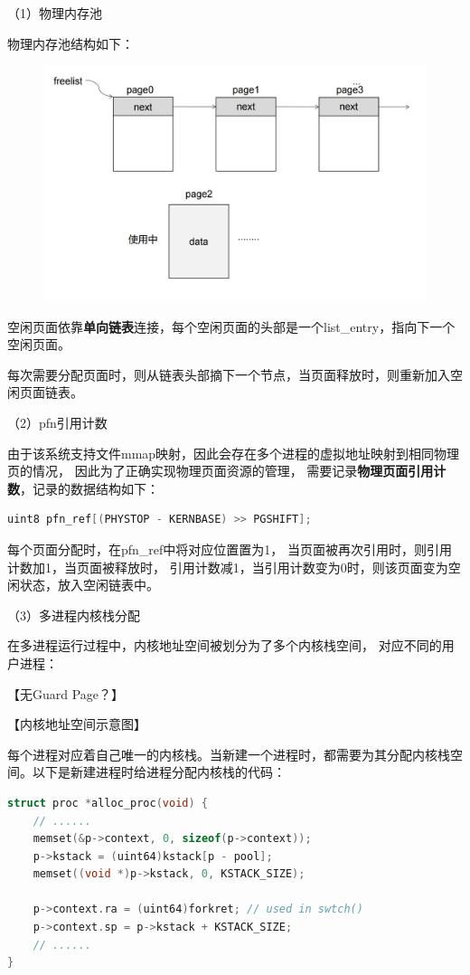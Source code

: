 \documentclass[UTF8,a4paper,10pt]{ctexart}
\begin{document}
（1）物理内存池

物理内存池结构如下：

\begin{figure}[H]
  \centering
  \includegraphics[scale=0.5]{image/mem02.jpg}
\end{figure}

空闲页面依靠\textbf{单向链表}连接，每个空闲页面的头部是一个list\_entry，指向下一个空闲页面。

每次需要分配页面时，则从链表头部摘下一个节点，当页面释放时，则重新加入空闲页面链表。

（2）pfn引用计数

由于该系统支持文件mmap映射，因此会存在多个进程的虚拟地址映射到相同物理页的情况，
因此为了正确实现物理页面资源的管理，
需要记录\textbf{物理页面引用计数}，记录的数据结构如下：

\begin{lstlisting}[title=页面引用计数,frame=trbl,language={C}]
  uint8 pfn_ref[(PHYSTOP - KERNBASE) >> PGSHIFT];
\end{lstlisting}

每个页面分配时，在pfn\_ref中将对应位置置为1，
当页面被再次引用时，则引用计数加1，当页面被释放时，
引用计数减1，当引用计数变为0时，则该页面变为空闲状态，放入空闲链表中。

（3）多进程内核栈分配

在多进程运行过程中，内核地址空间被划分为了多个内核栈空间，
对应不同的用户进程：

【无Guard Page？】

【内核地址空间示意图】

每个进程对应着自己唯一的内核栈。当新建一个进程时，都需要为其分配内核栈空间。以下是新建进程时给进程分配内核栈的代码：

\begin{lstlisting}[title=分配内核栈空间,frame=trbl,language={C}]
struct proc *alloc_proc(void) {
    // ......
    memset(&p->context, 0, sizeof(p->context));
    p->kstack = (uint64)kstack[p - pool];
    memset((void *)p->kstack, 0, KSTACK_SIZE);

    p->context.ra = (uint64)forkret; // used in swtch()
    p->context.sp = p->kstack + KSTACK_SIZE;
    // ......
}
\end{lstlisting}
\end{document}
